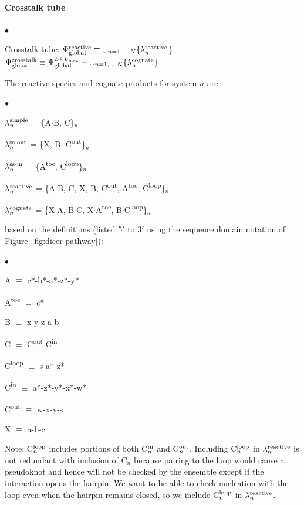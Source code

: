 \documentclass[11pt]{article}
\newcommand{\blist}{
 \begin{list}{$\bullet$}
 { \setlength{\itemsep}{2pt}
     \setlength{\parsep}{0pt}
     \setlength{\topsep}{6pt}
 } }
\newcommand{\elist}{
  \end{list}  }
\def\supsub#1#2{$^{\rm #1}_{#2}$}
\def\sub#1{$_{#1}$}
\def\super#1{\textsuperscript{#1}}
\newcommand{\plex}{$\cdot$}
\begin{document}
\paragraph{\bf Crosstalk tube}
\blist
\item Crosstalk tube: $\Psi^{\rm reactive}_{\rm global} \equiv \cup_{n=1,\dots,N}\{\lambda_n^{\rm reactive}$\};~~$\Psi^{\rm crosstalk}_{\rm global} \equiv \Psi^{L\le L_{\rm max}}_{\rm global} - \cup_{n=1,\dots,N}\{\lambda_n^{\rm cognate}\}$
\elist
The reactive species and cognate products for system $n$ are: 
\blist
\item $\lambda$\supsub{simple}{n}  = \{A\plex B, C\}\sub{n}
\item $\lambda$\supsub{\textrm{ss-out}}{n}  = \{X, B, C\super{out}\}\sub{n}
\item $\lambda$\supsub{\textrm{ss-in}}{n}  = \{A\super{toe}, C\super{loop}\}\sub{n}
\item $\lambda$\supsub{reactive}{n} = \{A\plex B, C, X, B, C\super{out}, A\super{toe}, C\super{loop}\}\sub{n}
\item $\lambda$\supsub{cognate}{n} = \{X\plex A, B\plex C, X\plex A\super{toe}, B\plex C\super{loop}\}\sub{n}
\elist
based on the definitions (listed 5$'$ to 3$'$ using the sequence domain notation of Figure~\ref{fig:dicer-pathway}):
\blist
\item A $\equiv$ c*-b*-a*-z*-y*
\item A\super{toe} $\equiv$ c*
\item B $\equiv$ x-y-z-a-b
\item C $\equiv$ C\super{out}-C\super{in}
\item C\super{loop} $\equiv$ s-a*-z*
\item C\super{in} $\equiv$ a*-z*-y*-x*-w*
\item C\super{out} $\equiv$ w-x-y-s
\item X $\equiv$ a-b-c
\elist
Note: C\supsub{loop}{n} includes portions of both C\supsub{in}{n} and C\supsub{out}{n}. 
Including C\supsub{loop}{n} in $\lambda^{\rm reactive}_n$ is not redundant with inclusion of C\sub{n} 
because pairing to the loop would cause a pseudoknot and hence will not be checked by the ensemble except if the interaction opens
the hairpin. We want to be able to check nucleation with the loop even when the hairpin remains closed,
so we include C\supsub{loop}{n} in $\lambda^{\rm reactive}_n$. 

\clearpage
\end{document}
